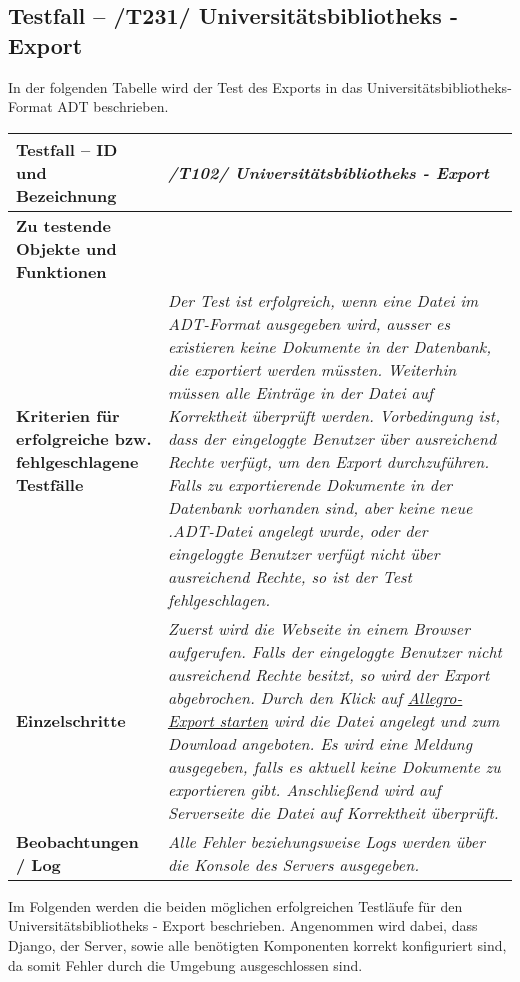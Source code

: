 \subsection{Testfall -- /T231/ Universitätsbibliotheks - Export}
In der folgenden Tabelle wird der Test des Exports in das
Universitätsbibliotheks-Format ADT beschrieben.
\begin{longtable}{|p{5cm}|p{10cm}|}
\hline
\textbf{Testfall -- ID und Bezeichnung} &  \textit{/T102/ Universitätsbibliotheks - Export} \\
\hline
\textbf{Zu testende Objekte und Funktionen} & 
\textit{
\begin{itemize}
  \item In Komponente \emph{Server (App: Documents)} die Funktion
	\lstinline{extras_allegro.export_allegro()}
\end{itemize} } \\
\hline
\textbf{Kriterien f\"ur erfolgreiche bzw. fehlgeschlagene Testf\"alle} &
\textit{Der Test ist erfolgreich, wenn eine Datei im ADT-Format ausgegeben
wird, ausser es existieren keine Dokumente in der Datenbank, die exportiert
werden müssten. Weiterhin müssen alle Einträge in der Datei auf Korrektheit
überprüft werden. Vorbedingung ist, dass der eingeloggte Benutzer über
ausreichend Rechte verfügt, um den Export durchzuführen. Falls zu exportierende
Dokumente in der Datenbank vorhanden sind, aber keine neue .ADT-Datei angelegt
wurde, oder der eingeloggte Benutzer verfügt nicht über ausreichend Rechte, so
ist der Test fehlgeschlagen. } \\
\hline
\textbf{Einzelschritte} & 
\textit{Zuerst wird die Webseite in einem Browser aufgerufen. Falls der
eingeloggte Benutzer nicht ausreichend Rechte besitzt, so wird der Export
abgebrochen. Durch den Klick auf \uline{Allegro-Export starten} wird die Datei angelegt und
zum Download angeboten. Es wird eine Meldung ausgegeben, falls es aktuell keine
Dokumente zu exportieren gibt. Anschließend wird auf Serverseite die Datei auf
Korrektheit überprüft. } \\
\hline
\textbf{Beobachtungen / Log} &  \textit{Alle Fehler beziehungsweise Logs werden
über die Konsole des Servers ausgegeben. } \\
\hline

 \end{longtable}

Im Folgenden werden die beiden möglichen erfolgreichen Testläufe für den
Universitätsbibliotheks - Export beschrieben. Angenommen wird dabei, dass
Django, der Server, sowie alle benötigten Komponenten korrekt konfiguriert
sind, da somit Fehler durch die Umgebung ausgeschlossen sind.

